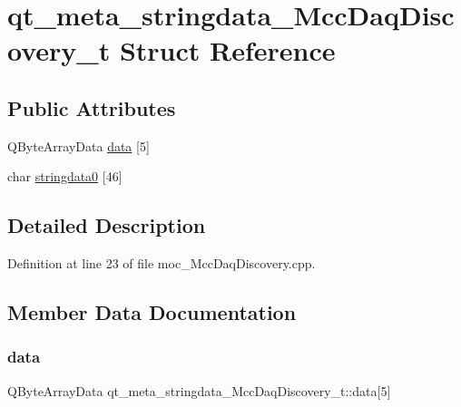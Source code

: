 \hypertarget{structqt__meta__stringdata___mcc_daq_discovery__t}{}\section{qt\+\_\+meta\+\_\+stringdata\+\_\+\+Mcc\+Daq\+Discovery\+\_\+t Struct Reference}
\label{structqt__meta__stringdata___mcc_daq_discovery__t}
\subsection*{Public Attributes}
\begin{DoxyCompactItemize}
\item 
Q\+Byte\+Array\+Data \hyperlink{structqt__meta__stringdata___mcc_daq_discovery__t_a3942a26085b7a2648acdfc9a5789d7e4}{data} \mbox{[}5\mbox{]}
\item 
char \hyperlink{structqt__meta__stringdata___mcc_daq_discovery__t_a93091d55f2177b08e3bc08c60fc1c3ff}{stringdata0} \mbox{[}46\mbox{]}
\end{DoxyCompactItemize}


\subsection{Detailed Description}


Definition at line 23 of file moc\+\_\+\+Mcc\+Daq\+Discovery.\+cpp.



\subsection{Member Data Documentation}
\mbox{\label{structqt__meta__stringdata___mcc_daq_discovery__t_a3942a26085b7a2648acdfc9a5789d7e4}} 
\subsubsection{\texorpdfstring{data}{data}}
{\footnotesize\ttfamily Q\+Byte\+Array\+Data qt\+\_\+meta\+\_\+stringdata\+\_\+\+Mcc\+Daq\+Discovery\+\_\+t\+::data\mbox{[}5\mbox{]}}



